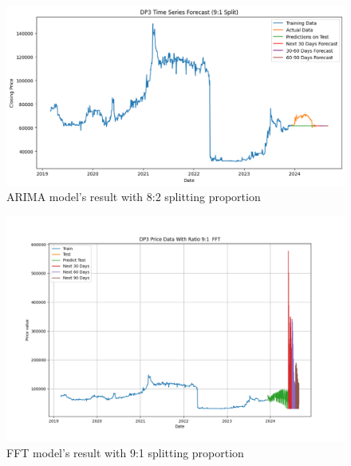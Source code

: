 \documentclass{ieeeojies}
\begin{document}
\vspace{-1em}

\begin{figure}[H]
  \centering
  \begin{minipage}{0.8\linewidth}
    \centering
    \includegraphics[width=\linewidth]{bibliography/Figure/DP3_ARIMA.png}
    \caption{ARIMA model's result with 8:2 splitting proportion}
    \label{fig8}
  \end{minipage}
\end{figure}

\vspace{-1em}

\begin{figure}[H]
  \centering
  \begin{minipage}{0.8\linewidth}
    \centering
    \includegraphics[width=\linewidth]{bibliography/Figure/FFT_91_DP3.png}
    \caption{FFT model's result with 9:1 splitting proportion}
    \label{fig8}
  \end{minipage}
\end{figure}
\end{document}
